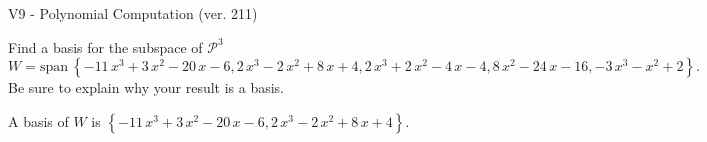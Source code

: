 \begin{exercise}
  \begin{exerciseTitle}V9 - Polynomial Computation (ver. 211)\end{exerciseTitle}
  \begin{exerciseStatement}
    Find a basis for the subspace of \(\mathcal{P}^3\) 
\[W=\mathrm{span}\ \left\{-11 \, x^{3} + 3 \, x^{2} - 20 \, x - 6 , 2 \, x^{3} - 2 \, x^{2} + 8 \, x + 4 , 2 \, x^{3} + 2 \, x^{2} - 4 \, x - 4 , 8 \, x^{2} - 24 \, x - 16 , -3 \, x^{3} - x^{2} + 2\right\}.\]
 Be sure to explain why your result is a basis.


  \end{exerciseStatement}
  \begin{exerciseAnswer}
   A basis of \(W\) is  \(\left\{-11 \, x^{3} + 3 \, x^{2} - 20 \, x - 6 , 2 \, x^{3} - 2 \, x^{2} + 8 \, x + 4\right\}\).
  


  \end{exerciseAnswer}
\end{exercise}
